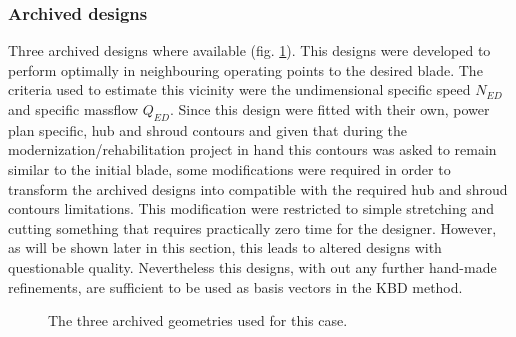 \subsubsection{Archived designs}
 Three archived designs where available (fig. \ref{design-bases}). This designs were developed to perform optimally in neighbouring operating points to the desired blade. The criteria used to estimate this vicinity were the undimensional specific speed $N_{ED}$ and specific massflow $Q_{ED}$. Since this design were fitted with their own, power plan specific, hub and shroud contours and given that during the modernization/rehabilitation project in hand this contours was asked to remain similar to the initial blade, some modifications were required in order to transform the archived designs into compatible with the required hub and shroud contours limitations. This modification were restricted to simple stretching and cutting something that requires practically zero time for the designer. However, as will be shown later in this section, this leads to altered designs with questionable quality. Nevertheless this designs, with out any further hand-made refinements, are sufficient to be used as basis vectors in the KBD method.                           

\begin{figure}[h!]
\begin{minipage}[b]{1\linewidth}
 \centering
\end{minipage}
\caption{The three archived geometries used for this case.}
\label{design-bases}
\end{figure}

